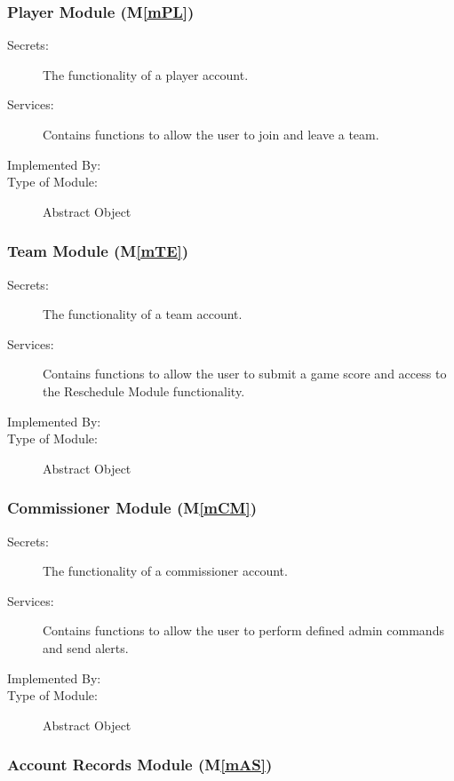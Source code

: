 \documentclass[12pt, titlepage]{article}
\newcommand{\mref}[1]{M\ref{#1}}
\begin{document}
\subsubsection{Player Module (\mref{mPL})}

\begin{description}
  \item[Secrets:]The functionality of a player account.
  \item[Services:]Contains functions to allow the user to join and leave a
  team.
  \item[Implemented By:] \progname{}
  \item[Type of Module:] Abstract Object
\end{description}

\subsubsection{Team Module (\mref{mTE})}

\begin{description}
  \item[Secrets:]The functionality of a team account.
  \item[Services:]Contains functions to allow the user to submit a game score
  and access to the Reschedule Module functionality.
  \item[Implemented By:] \progname{}
  \item[Type of Module:] Abstract Object
\end{description}

\subsubsection{Commissioner Module (\mref{mCM})}

\begin{description}
  \item[Secrets:]The functionality of a commissioner account.
  \item[Services:]Contains functions to allow the user to perform defined
  admin commands and send alerts.
  \item[Implemented By:] \progname{}
  \item[Type of Module:] Abstract Object
\end{description}

\subsubsection{Account Records Module (\mref{mAS})}
\end{document}
